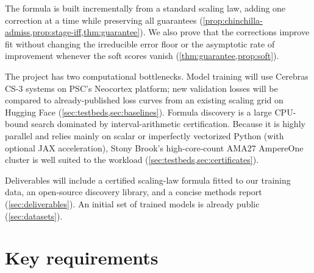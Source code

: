 \documentclass[11pt]{article}
\theoremstyle{plain}
\theoremstyle{remark}
\begin{document}
The formula is built incrementally from a standard scaling law, adding one correction at a time while preserving all guarantees (\cref{prop:chinchilla-admiss,prop:stage-iff,thm:guarantee}). We also prove that the corrections improve fit without changing the irreducible error floor or the asymptotic rate of improvement whenever the soft scores vanish (\cref{thm:guarantee,prop:soft}).

The project has two computational bottlenecks. Model training will use Cerebras CS-3 systems on PSC's Neocortex platform; new validation losses will be compared to already-published loss curves from an existing scaling grid on Hugging Face (\cref{sec:testbeds,sec:baselines}). Formula discovery is a large CPU-bound search dominated by interval-arithmetic certification. Because it is highly parallel and relies mainly on scalar or imperfectly vectorized Python (with optional JAX acceleration), Stony Brook's high-core-count AMA27 AmpereOne cluster is well suited to the workload (\cref{sec:testbeds,sec:certificates}).

Deliverables will include a certified scaling-law formula fitted to our training data, an open-source discovery library, and a concise methods report (\cref{sec:deliverables}). An initial set of trained models is already public (\cref{sec:datasets}).

\section{Key requirements}\label{sec:requirements}
\end{document}
